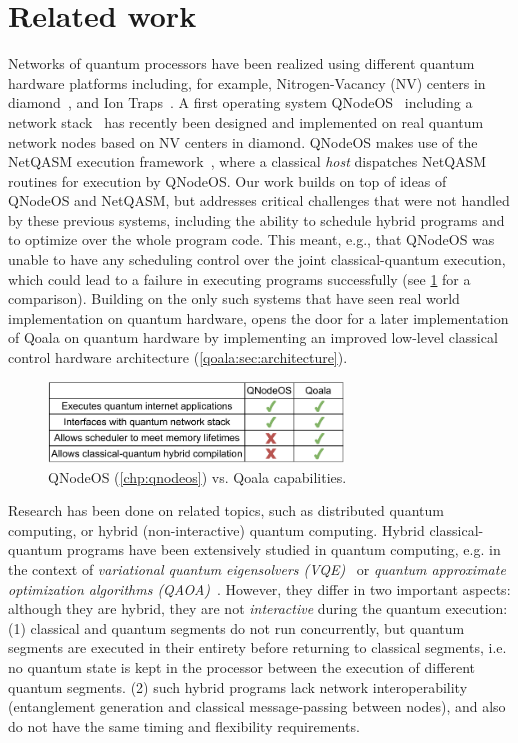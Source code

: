 \section{Related work}
\label{qoala:sec:related_work}

Networks of quantum processors have been realized using different quantum hardware platforms including, for example, Nitrogen-Vacancy (NV) centers in diamond~\cite{pompili2021realization}, and Ion Traps~\cite{krutyanskiy2023entanglement}.
A first operating system QNodeOS~\cite{carlothesis} including a network stack~\cite{pompili2022experimental} has recently been designed and implemented on real quantum network nodes based on NV centers in diamond.
QNodeOS makes use of the NetQASM execution framework~\cite{dahlberg2022netqasm}, where a classical \textit{host} dispatches NetQASM routines for execution by QNodeOS. 
Our work builds on top of ideas of QNodeOS and NetQASM, but addresses critical challenges that were not handled by these previous systems, including the ability to schedule hybrid programs and to optimize over the whole program code.
This meant, e.g., that QNodeOS was unable to have any scheduling control over the joint classical-quantum execution, which could lead to a failure in executing programs successfully (see \cref{qoala:fig:qoala_vs_qnos} for a comparison).
Building on the only such systems that have seen real world implementation on quantum hardware, opens the door for a later implementation of Qoala on quantum hardware by implementing an improved low-level classical control hardware architecture (\cref{qoala:sec:architecture}).

\begin{figure}[t]
    \centering
    \includegraphics[width=0.7\textwidth]{figures/qoala/qoala_vs_qnos.pdf}
    \caption{
        QNodeOS (\cref{chp:qnodeos}) vs. Qoala capabilities.
    }
    \label{qoala:fig:qoala_vs_qnos}
\end{figure}

Research has been done on related topics, such as distributed quantum computing, or hybrid (non-interactive) quantum computing. Hybrid classical-quantum programs have been extensively studied in quantum computing, e.g. in the context of \textit{variational quantum eigensolvers (VQE)}~\cite{diadamo2021distributed, liu2022layer} or \textit{quantum approximate optimization algorithms (QAOA)}~\cite{farhi2014quantum}. However, they differ in two important aspects: although they are hybrid, they are not \textit{interactive} during the quantum execution:
(1) classical and quantum segments do not run concurrently, but quantum segments are executed in their entirety before returning to classical segments, i.e. no quantum state is kept in the processor between the execution of different quantum segments.
(2) such hybrid programs lack network interoperability (entanglement generation and classical message-passing between nodes), and also do not have the same timing and flexibility requirements.

